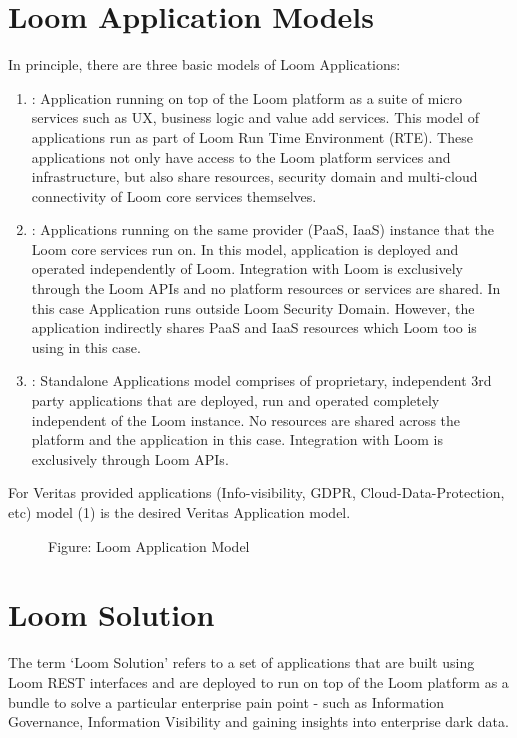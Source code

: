 \documentclass[letterpaper,10pt,english]{sphinxmanual}
\begin{document}
\section{Loom Application Models}
\label{\detokenize{mcdmp_concepts:term-loom-app-models}}\label{\detokenize{mcdmp_concepts:loom-application-models}}
In principle, there are three basic models of Loom Applications:
\begin{enumerate}
\item {} 
: Application running on top of the Loom platform as a suite of micro services such as UX, business logic and value add services. This model of applications run as part of Loom Run Time Environment (RTE).  These applications not only have access to the Loom platform services and infrastructure, but also share resources, security domain and multi-cloud connectivity of Loom core services themselves.

\item {} 
: Applications running on the same provider (PaaS, IaaS) instance that the Loom core services run on.  In this model, application is deployed and operated independently of Loom. Integration with Loom is exclusively through the Loom APIs and no platform resources or services are shared. In this case Application runs outside Loom Security Domain.  However, the application indirectly shares PaaS and IaaS resources which Loom too is using in this case.

\item {} 
: Standalone Applications model comprises of proprietary, independent 3rd party applications that are deployed, run and operated completely independent of the Loom instance.  No resources are shared across the platform and the application in this case. Integration with Loom is exclusively through Loom APIs.

\end{enumerate}

For Veritas provided applications (Info-visibility, GDPR, Cloud-Data-Protection, etc) model (1) is the desired Veritas Application model.

\begin{figure}[htbp]
\centering
\capstart

\noindent{}
\caption{Figure: Loom Application Model}\label{\detokenize{mcdmp_concepts:id13}}\end{figure}


\section{Loom Solution}
\label{\detokenize{mcdmp_concepts:loom-solution}}
The term ‘Loom Solution’ refers to a set of applications that are built using Loom REST interfaces and are deployed to run on top of the Loom platform as a bundle to solve a particular enterprise pain point - such as Information Governance, Information Visibility and gaining insights into enterprise dark data.
\end{document}
